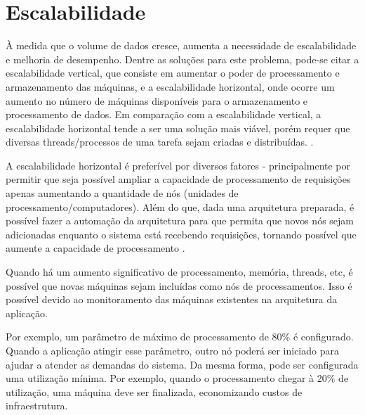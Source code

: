 \chapter{Escalabilidade}

\begin{citacao}

À medida que o volume de dados cresce, aumenta a
necessidade de escalabilidade e melhoria de desempenho. Dentre as soluções para este
problema, pode-se citar a escalabilidade vertical, que consiste em aumentar o poder de
processamento e armazenamento das máquinas, e a escalabilidade horizontal, onde ocorre um
aumento no número de máquinas disponíveis para o armazenamento e processamento de
dados. Em comparação com a escalabilidade vertical, a escalabilidade horizontal tende a ser
uma solução mais viável, porém requer que diversas threads/processos de uma tarefa sejam
criadas e distribuídas. \cite[3]{alexandre-morais-souza-2013}.

\end{citacao}

A escalabilidade horizontal é preferível por diversos fatores - principalmente por
permitir que seja possível ampliar a capacidade de processamento de requisições
apenas aumentando a quantidade de nós (unidades de processamento/computadores).
Além do que, dada uma arquitetura preparada, é possível fazer a automação da
arquitetura para que permita que novos nós sejam adicionadas enquanto o
sistema está recebendo requisições, tornando possível que aumente a capacidade
de processamento \cite{ivens-oliveira-porto-2009}.

Quando há um aumento significativo de processamento, memória, threads, etc,
é possível que novas máquinas sejam incluídas como nós de processamentos.
Isso é possível devido ao monitoramento das máquinas existentes na arquitetura
da aplicação.

Por exemplo, um parâmetro de máximo de processamento de 80\% é configurado.
Quando a aplicação atingir esse parâmetro, outro nó poderá ser iniciado para ajudar
a atender as demandas do sistema. Da mesma forma, pode ser configurada uma utilização
mínima. Por exemplo, quando o processamento chegar à 20\% de utilização, uma máquina
deve ser finalizada, economizando custos de infraestrutura.






